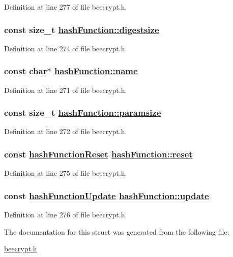 Definition at line 277 of file beecrypt.h.\hypertarget{structhashFunction_o3}{
\subsubsection[digestsize]{\setlength{\rightskip}{0pt plus 5cm}const size\_\-t \hyperlink{structhashFunction_o3}{hash\-Function::digestsize}}}
\label{structhashFunction_o3}


Definition at line 274 of file beecrypt.h.\hypertarget{structhashFunction_o0}{
\subsubsection[name]{\setlength{\rightskip}{0pt plus 5cm}const char$\ast$ \hyperlink{structhashFunction_o0}{hash\-Function::name}}}
\label{structhashFunction_o0}


Definition at line 271 of file beecrypt.h.\hypertarget{structhashFunction_o1}{
\subsubsection[paramsize]{\setlength{\rightskip}{0pt plus 5cm}const size\_\-t \hyperlink{structhashFunction_o1}{hash\-Function::paramsize}}}
\label{structhashFunction_o1}


Definition at line 272 of file beecrypt.h.\hypertarget{structhashFunction_o4}{
\subsubsection[reset]{\setlength{\rightskip}{0pt plus 5cm}const \hyperlink{beecrypt_8h_a7}{hash\-Function\-Reset} \hyperlink{structhashFunction_o4}{hash\-Function::reset}}}
\label{structhashFunction_o4}


Definition at line 275 of file beecrypt.h.\hypertarget{structhashFunction_o5}{
\subsubsection[update]{\setlength{\rightskip}{0pt plus 5cm}const \hyperlink{beecrypt_8h_a8}{hash\-Function\-Update} \hyperlink{structhashFunction_o5}{hash\-Function::update}}}
\label{structhashFunction_o5}


Definition at line 276 of file beecrypt.h.

The documentation for this struct was generated from the following file:\begin{CompactItemize}
\item 
\hyperlink{beecrypt_8h}{beecrypt.h}\end{CompactItemize}
